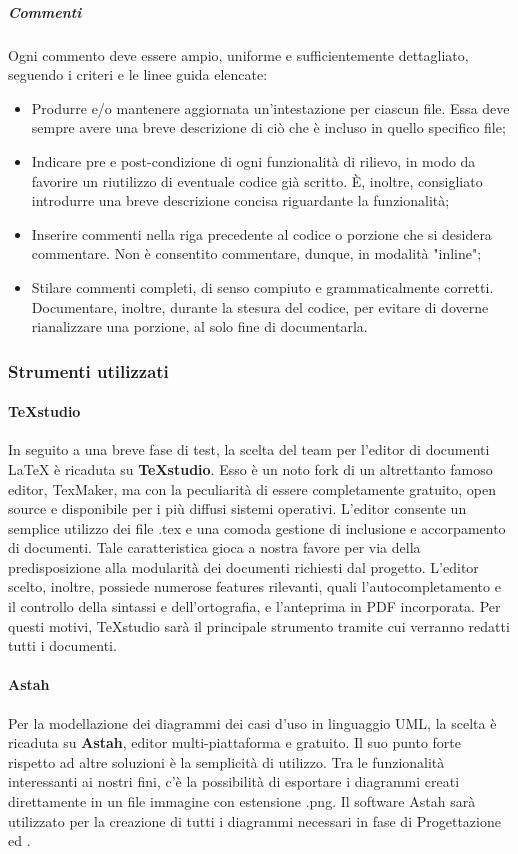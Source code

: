 			\subparagraph{Commenti}
			Ogni commento deve essere ampio, uniforme e sufficientemente dettagliato, seguendo i criteri e le linee guida elencate:
			\begin{itemize}
			\item Produrre e/o mantenere aggiornata un'intestazione per ciascun file. Essa deve sempre avere una breve descrizione di ciò che è incluso in quello specifico file;
			\item Indicare pre e post-condizione di ogni funzionalità di rilievo, in modo da favorire un riutilizzo di eventuale codice già scritto. \MakeUppercase{è}, inoltre, consigliato introdurre una breve descrizione concisa riguardante la funzionalità;
			\item Inserire commenti nella riga precedente al codice o porzione che si desidera commentare. Non è consentito commentare, dunque, in modalità "inline";
			\item Stilare commenti completi, di senso compiuto e grammaticalmente corretti. Documentare, inoltre, durante la stesura del codice, per evitare di doverne rianalizzare una porzione, al solo fine di documentarla.
			\end{itemize}
		
	\subsubsection{Strumenti utilizzati}
	
		\paragraph{TeXstudio}
		In seguito a una breve fase di test, la scelta del team per l'editor di documenti LaTeX è ricaduta su \textbf{TeXstudio}. Esso è un noto fork di un altrettanto famoso editor, TexMaker, ma con la peculiarità di essere completamente gratuito, open source e disponibile per i più diffusi sistemi operativi. L'editor consente un semplice utilizzo dei file .tex e una comoda gestione di inclusione e accorpamento di documenti. Tale caratteristica gioca a nostra favore per via della predisposizione alla modularità dei documenti richiesti dal progetto. L'editor scelto, inoltre, possiede numerose features rilevanti, quali l'autocompletamento e il controllo della sintassi e dell'ortografia, e l'anteprima in PDF incorporata. Per questi motivi, TeXstudio sarà il principale strumento tramite cui verranno redatti tutti i documenti.
	
		\paragraph{Astah}
		Per la modellazione dei diagrammi dei casi d'uso in linguaggio UML, la scelta è ricaduta su \textbf{Astah}, editor multi-piattaforma e gratuito. Il suo punto forte rispetto ad altre soluzioni è la semplicità di utilizzo. Tra le funzionalità interessanti ai nostri fini, c'è la possibilità di esportare i diagrammi creati direttamente in un file immagine con estensione .png. Il software Astah sarà utilizzato per la creazione di tutti i diagrammi necessari in fase di Progettazione ed \AdR.
